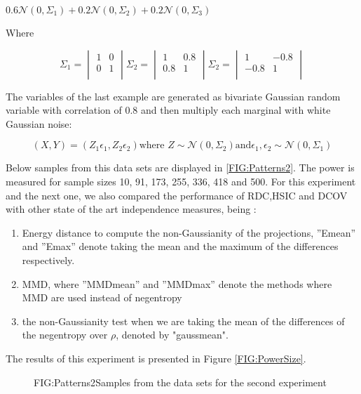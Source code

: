 $0.6\mathcal{N}(0,\Sigma_{1}) + 0.2\mathcal{N}(0,\Sigma_{2}) + 0.2\mathcal{N}(0,\Sigma_{3})$

Where 

$$\Sigma_{1} =\begin{vmatrix}1&0\\0&1\\ \end{vmatrix} \Sigma_{2} =\begin{vmatrix}1&0.8\\0.8&1\\ \end{vmatrix} \Sigma_{2} =\begin{vmatrix}1&-0.8\\-0.8&1\\ \end{vmatrix}$$

The variables of the last example are generated as bivariate Gaussian random variable with correlation of 0.8 and then multiply each marginal with white Gaussian noise:

$$(X,Y) = (Z_{1}\epsilon_{1},Z_{2}\epsilon_{2}) \text{where } Z\sim\mathcal{N}(0,\Sigma_{2}) \text{and} \epsilon_{1},\epsilon_{2}\sim\mathcal{N}(0,\Sigma_{1})$$

Below samples from this data sets are displayed in \ref{FIG:Patterns2}. The power is measured for sample sizes 10,  91, 173, 255, 336, 418 and 500. For this experiment and the next one, we also compared the performance of RDC,HSIC and DCOV with other state of the art independence measures, being : 

\begin{enumerate}
\item Energy distance to compute the non-Gaussianity of the projections, ”Emean” and ”Emax” denote taking the mean and the maximum of the differences respectively.
\item MMD, where ”MMDmean” and ”MMDmax” denote the methods where
MMD are used instead of negentropy
\item the non-Gaussianity test when we are taking the mean of the differences of the negentropy over $\rho$, denoted by "gaussmean".
\end{enumerate}

The results of this experiment is presented in Figure \ref{FIG:PowerSize}. 
\FloatBarrier
\begin{figure}[Non linear dependance patterns example 2]{FIG:Patterns2}{Samples from the data sets for the second experiment}
\end{figure}

